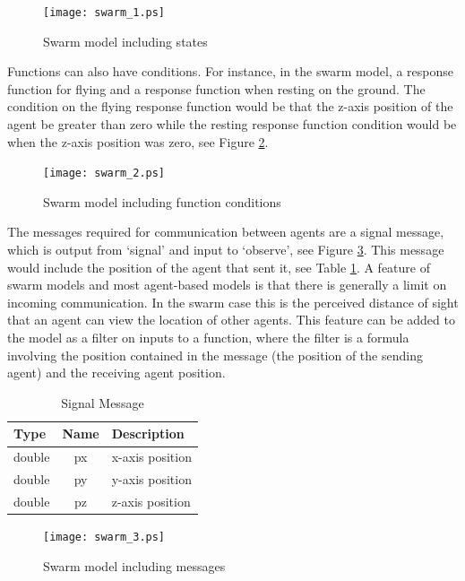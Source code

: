 \begin{figure}[ht]
\begin{center}
\texttt{[image: swarm\_1.ps]}
\caption{Swarm model including states}
\label{fig:swarm_1}
\end{center}
\end{figure}

Functions can also have conditions. For instance, in
the swarm model, a response function for flying and a response function when
resting on the ground. The condition on the flying response function would be that the
z-axis position of the agent be greater than zero while the resting response
function condition would be when the z-axis position was zero, see Figure
\ref{fig:swarm_2}.

\begin{figure}[ht]
\begin{center}
\texttt{[image: swarm\_2.ps]}
\caption{Swarm model including function conditions}
\label{fig:swarm_2}
\end{center}
\end{figure}

The messages required for communication between agents are a signal message,
which is output from `signal' and input to `observe', see Figure
\ref{fig:swarm_3}. This message would include the position of the agent that
sent it, see Table \ref{tab:signal_message}. A feature of swarm models and most
agent-based models is that there is generally a limit on incoming communication. 
In the swarm case this is the perceived distance of sight that an agent can view the location of other
agents. This feature can be added to the model as a filter on inputs to a
function, where the filter is a formula involving the position contained in the
message (the position of the sending agent) and the receiving agent position.

\begin{table}[ht]
\centering
\begin{tabular}{|l||c||l|}
\hline
Type&Name&Description\\
\hline \hline
double&px&x-axis position\\
\hline
double&py&y-axis position\\
\hline
double&pz&z-axis position\\
\hline
\end{tabular}
\caption{Signal Message}
\label{tab:signal_message}
\end{table}

\begin{figure}[ht]
\begin{center}
\texttt{[image: swarm\_3.ps]}
\caption{Swarm model including messages}
\label{fig:swarm_3}
\end{center}
\end{figure}


